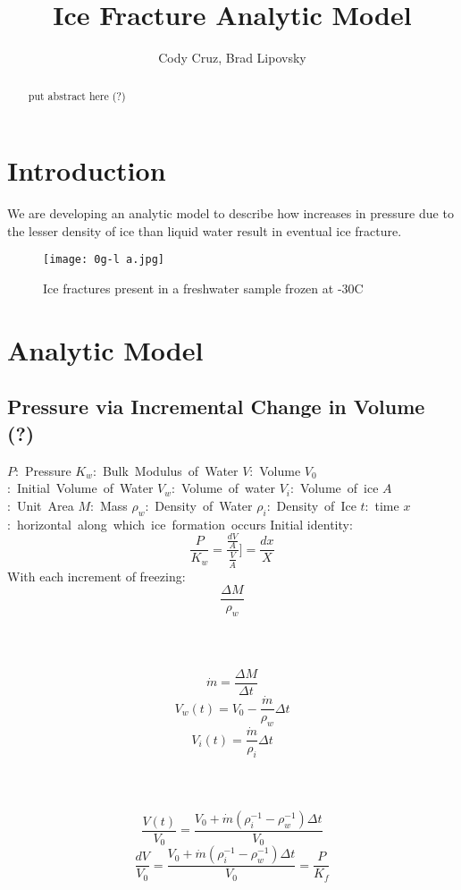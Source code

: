 \documentclass{article}
\title{Ice Fracture Analytic Model}
\author{Cody Cruz, Brad Lipovsky}
\begin{document}
\maketitle

\begin{abstract}
    put abstract here (?)
\end{abstract}

\section{Introduction}
We are developing an analytic model to describe how increases in pressure due to the lesser density of ice than liquid water result in eventual ice fracture. 

\begin{figure}
\centering
\texttt{[image: 0g-l a.jpg]}
\caption{\label{fig:0g-l a}Ice fractures present in a freshwater sample frozen at -30C}
\end{figure}
\pagebreak
\section{Analytic Model}

\subsection{Pressure via Incremental Change in Volume (?)}

\mbox{$P$: Pressure} \linebreak
\mbox{$K_w$: Bulk Modulus of Water} \linebreak
\mbox{$V$: Volume} \linebreak
\mbox{$V_0$: Initial Volume of Water} \linebreak
\mbox{$V_w$: Volume of water} \linebreak
\mbox{$V_i$: Volume of ice} \linebreak
\mbox{$A$: Unit Area} \linebreak
\mbox{$M$: Mass} \linebreak
\mbox{$\rho_w$: Density of Water} \linebreak
\mbox{$\rho_i$: Density of Ice} \linebreak
\mbox{$t$: time} \linebreak
\mbox{$x$: horizontal along which ice formation occurs} \linebreak
Initial identity:
\[\frac{P}{K_w} = \frac{\frac{dV}{A}}{\frac{V}{A}}] = \frac{dx}{X}\]
With each increment of freezing:
\[\frac{\Delta M}{\rho_w}\] 
\\
\\
\\
\[\dot{m} = \frac{\Delta M}{\Delta t}\]
\[V_w(t) = V_0 - \frac{\dot{m}}{\rho_w} \Delta t\]
\[V_i(t) = \frac{\dot{m}}{\rho_i} \Delta t\]
\\
\\
\\
\[\frac{V(t)}{V_0} = \frac{V_0 + \dot{m}(\rho_i^{-1} - \rho_w^{-1}) \Delta t}{V_0}\]
\[\frac{dV}{V_0} = \frac{V_0 + \dot{m}(\rho_i^{-1} - \rho_w^{-1}) \Delta t}{V_0} = \frac{P}{K_f}\]
\end{document}
